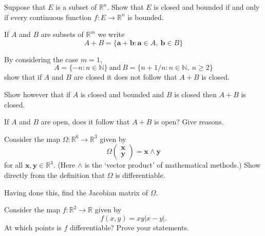 \begin{question}
Suppose that $E$ is a subset of ${\mathbb R}^{n}$.
Show that $E$ is closed and bounded if and only if
every continuous function $f:E\rightarrow{\mathbb R}^{n}$
is bounded.                      

\end{question}
\begin{question}
If $A$ and $B$ are subsets of ${\mathbb R}^{m}$
we write
\[A+B=\{{\mathbf a}+{\mathbf b}:
{\mathbf a}\in A,\ {\mathbf b}\in B\}\]

By considering the case $m=1$, 
\[A=\{-n:n\in{\mathbb N}\}\ \text{and}
\ B=\{n+1/n:n\in{\mathbb N},\ n\geq 2\}\]
show that if $A$ and $B$ are closed it does not follow
that $A+B$ is closed.

Show however that if $A$ is closed and bounded and
$B$ is closed then $A+B$ is closed.

If $A$ and $B$ are open, does it follow that $A+B$
is open? Give reasons.  

\end{question}
\begin{question}
Consider the map 
$\Omega:{\mathbb R}^{6}\rightarrow{\mathbb R}^{3}$
given by
\[\Omega\begin{pmatrix}{\mathbf x}\\{\mathbf y}
\end{pmatrix}=
{\mathbf x}\wedge{\mathbf y}\]
for all ${\mathbf x},{\mathbf y}\in{\mathbb R}^{3}$.
(Here $\wedge$ is the `vector product' of mathematical
methods.)
Show directly from
the definition that $\Omega$ is differentiable.

Having done this, find the Jacobian matrix of $\Omega$.

\end{question}
\begin{question} Consider the map
$f:{\mathbb R}^{2}\rightarrow{\mathbb R}$ given 
by
\[f(x,y)=xy|x-y|.\]
At which points is $f$ differentiable? Prove
your statements.


\end{question}
